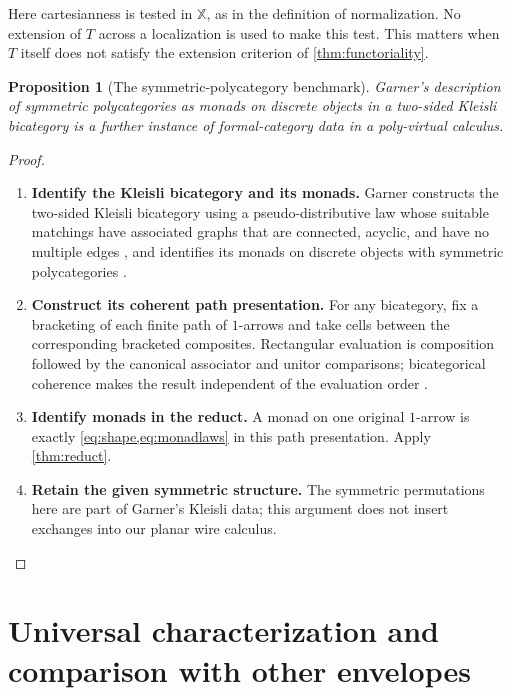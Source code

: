 \documentclass[11pt,reqno]{amsart}
\theoremstyle{plain}
\newtheorem{proposition}[theorem]{Proposition}
\theoremstyle{definition}
\theoremstyle{remark}
\numberwithin{equation}{section}
\begin{document}
Here cartesianness is tested in $\mathbb X$, as in the definition of
normalization. No extension of $T$ across a localization is used to make
this test. This matters when $T$ itself does not satisfy the extension
criterion of \cref{thm:functoriality}.

\begin{proposition}[The symmetric-polycategory benchmark]
Garner's description of symmetric polycategories as monads on discrete
objects in a two-sided Kleisli bicategory is a further instance of
formal-category data in a poly-virtual calculus.
\end{proposition}
\begin{proof}\leavevmode
\begin{enumerate}
\item \textbf{Identify the Kleisli bicategory and its monads.} Garner constructs the two-sided Kleisli bicategory using a
pseudo-distributive law whose suitable matchings have associated graphs
that are connected, acyclic, and have no multiple edges
\cite[Proposition 9 and Definition 14]{Garner2008}, and identifies its
monads on discrete objects with symmetric polycategories
\cite[Theorem 42]{Garner2008}.

\item \textbf{Construct its coherent path presentation.} For any bicategory, fix a bracketing of each finite path of $1$-arrows
and take cells between the corresponding bracketed composites. Rectangular
evaluation is composition followed by the canonical associator and unitor
comparisons; bicategorical coherence makes the result independent of the
evaluation order \cite[Section 1.5]{Leinster2004}.

\item \textbf{Identify monads in the reduct.} A monad on
one original $1$-arrow is exactly \cref{eq:shape,eq:monadlaws} in
this path presentation. Apply \cref{thm:reduct}.

\item \textbf{Retain the given symmetric structure.} The symmetric
permutations here are part of Garner's Kleisli data; this argument does
not insert exchanges into our planar wire calculus.\qedhere
\end{enumerate}
\end{proof}

\section{Universal characterization and comparison with other envelopes}\label{sec:comparison}
\end{document}
